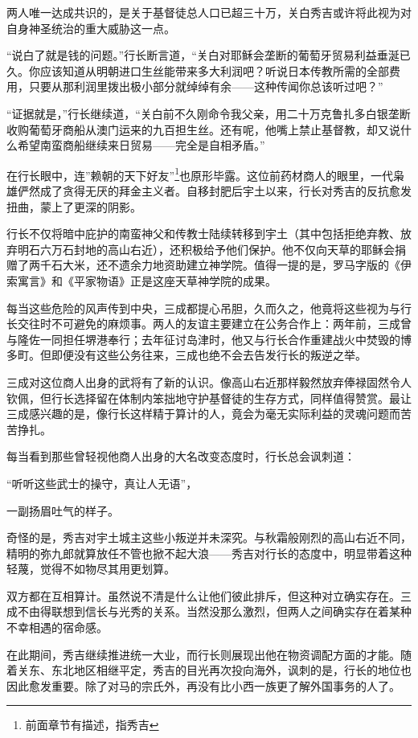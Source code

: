 \documentclass[
]{book}
\begin{document}
两人唯一达成共识的，是关于基督徒总人口已超三十万，关白秀吉或许将此视为对自身神圣统治的重大威胁这一点。

``说白了就是钱的问题。''行长断言道，``关白对耶稣会垄断的葡萄牙贸易利益垂涎已久。你应该知道从明朝进口生丝能带来多大利润吧？听说日本传教所需的全部费用，只要从那利润里拨出极小部分就绰绰有余------这种传闻你总该听过吧？''

``证据就是，''行长继续道，``关白前不久刚命令我父亲，用二十万克鲁扎多白银垄断收购葡萄牙商船从澳门运来的九百担生丝。还有呢，他嘴上禁止基督教，却又说什么希望南蛮商船继续来日贸易------完全是自相矛盾。''

在行长眼中，连''赖朝的天下好友''\footnote{前面章节有描述，指秀吉}也原形毕露。这位前药材商人的眼里，一代枭雄俨然成了贪得无厌的拜金主义者。自移封肥后宇土以来，行长对秀吉的反抗愈发扭曲，蒙上了更深的阴影。

行长不仅将暗中庇护的南蛮神父和传教士陆续转移到宇土（其中包括拒绝弃教、放弃明石六万石封地的高山右近），还积极给予他们保护。他不仅向天草的耶稣会捐赠了两千石大米，还不遗余力地资助建立神学院。值得一提的是，罗马字版的《伊索寓言》和《平家物语》正是这座天草神学院的成果。

每当这些危险的风声传到中央，三成都提心吊胆，久而久之，他竟将这些视为与行长交往时不可避免的麻烦事。两人的友谊主要建立在公务合作上：两年前，三成曾与隆佐一同担任堺港奉行；去年征讨岛津时，他又与行长合作重建战火中焚毁的博多町。但即便没有这些公务往来，三成也绝不会去告发行长的叛逆之举。

三成对这位商人出身的武将有了新的认识。像高山右近那样毅然放弃俸禄固然令人钦佩，但行长选择留在体制内笨拙地守护基督徒的生存方式，同样值得赞赏。最让三成感兴趣的是，像行长这样精于算计的人，竟会为毫无实际利益的灵魂问题而苦苦挣扎。

每当看到那些曾轻视他商人出身的大名改变态度时，行长总会讽刺道：

``听听这些武士的操守，真让人无语''，

一副扬眉吐气的样子。

奇怪的是，秀吉对宇土城主这些小叛逆并未深究。与秋霜般刚烈的高山右近不同，精明的弥九郎就算放任不管也掀不起大浪------秀吉对行长的态度中，明显带着这种轻蔑，觉得不如物尽其用更划算。

双方都在互相算计。虽然说不清是什么让他们彼此排斥，但这种对立确实存在。三成不由得联想到信长与光秀的关系。当然没那么激烈，但两人之间确实存在着某种不幸相遇的宿命感。

在此期间，秀吉继续推进统一大业，而行长则展现出他在物资调配方面的才能。随着关东、东北地区相继平定，秀吉的目光再次投向海外，讽刺的是，行长的地位也因此愈发重要。除了对马的宗氏外，再没有比小西一族更了解外国事务的人了。
\end{document}

